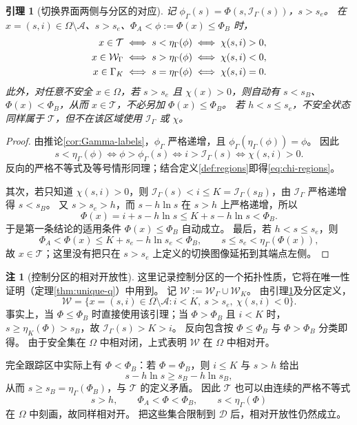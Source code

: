 \documentclass[11pt,a4paper,UTF8]{ctexart}
\newtheorem{lemma}[theorem]{引理}
\theoremstyle{definition}
\newtheorem{remark}[theorem]{注}
\newcommand{\Acal}{\mathcal A}
\newcommand{\Dcal}{\mathcal D}
\begin{document}
\begin{lemma}[切换界面两侧与分区的对应]
\label{lem:chi-regions}
记 $\phi_\Gamma(s)=\Phi(s,\mathcal I_\Gamma(s))$，$s>s_e$。
在 $x=(s,i)\in\Omega\setminus\Acal$、$s>s_e$、$\Phi_A<\phi:=\Phi(x)\le\Phi_B$ 时，
\begin{align}
x\in\mathcal T&\iff s<\eta_\Gamma(\phi)\iff\chi(s,i)>0,\notag\\
x\in\mathcal W_\Gamma&\iff s>\eta_\Gamma(\phi)\iff\chi(s,i)<0,\notag\\
x\in\Gamma_K&\iff s=\eta_\Gamma(\phi)\iff\chi(s,i)=0.
\label{eq:chi-regions}
\end{align}
此外，对任意不安全 $x\in\Omega$，若 $s>s_e$ 且 $\chi(x)>0$，则自动有
$s<s_B$、$\Phi(x)<\Phi_B$，从而 $x\in\mathcal T$，不必另加 $\Phi(x)\le\Phi_B$。
若 $h<s\le s_e$，不安全状态同样属于 $\mathcal T$，但不在该区域使用 $\mathcal I_\Gamma$ 或 $\chi$。
\end{lemma}
\begin{proof}
由推论\ref{cor:Gamma-labels}，$\phi_\Gamma$ 严格递增，且 $\phi_\Gamma(\eta_\Gamma(\phi))=\phi$。
因此
\[
s<\eta_\Gamma(\phi)
\iff \phi>\phi_\Gamma(s)
\iff i>\mathcal I_\Gamma(s)
\iff \chi(s,i)>0.
\]
反向的严格不等式及等号情形同理；结合定义\ref{def:regions}即得\eqref{eq:chi-regions}。

其次，若只知道 $\chi(s,i)>0$，则 $\mathcal I_\Gamma(s)<i\le K=\mathcal I_\Gamma(s_B)$，由 $\mathcal I_\Gamma$ 严格递增得 $s<s_B$。
又 $s>s_e>h$，而 $s-h\ln s$ 在 $s>h$ 上严格递增，所以
\[
\Phi(x)=i+s-h\ln s\le K+s-h\ln s<\Phi_B.
\]
于是第一条结论的适用条件 $\Phi(x)\le\Phi_B$ 自动成立。
最后，若 $h<s\le s_e$，则
\[
\Phi_A<\Phi(x)\le K+s_e-h\ln s_e<\Phi_B,
\qquad s\le s_e<\eta_\Gamma(\Phi(x)),
\]
故 $x\in\mathcal T$；这里没有把只在 $s>s_e$ 上定义的切换图像延拓到其端点左侧。
\end{proof}

\begin{remark}[控制分区的相对开放性]
\label{rem:relative-open-control-regions}
这里记录控制分区的一个拓扑性质，它将在唯一性证明（定理\ref{thm:unique-q}）中用到。
记 $\mathcal W:=\mathcal W_\Gamma\cup\mathcal W_K$。
由引理\ref{lem:chi-regions}及分区定义，
\[
\mathcal W
=\{x=(s,i)\in\Omega\setminus\Acal:
  i<K,\ s>s_e,\ \chi(s,i)<0\}.
\]
事实上，当 $\Phi\le\Phi_B$ 时直接使用该引理；当 $\Phi>\Phi_B$ 且 $i<K$ 时，$s\ge\eta_K(\Phi)>s_B$，故 $\mathcal I_\Gamma(s)>K>i$。
反向包含按 $\Phi\le\Phi_B$ 与 $\Phi>\Phi_B$ 分类即得。
由于安全集在 $\Omega$ 中相对闭，上式表明 $\mathcal W$ 在 $\Omega$ 中相对开。

完全跟踪区中实际上有 $\Phi<\Phi_B$：若 $\Phi=\Phi_B$，则 $i\le K$ 与 $s>h$ 给出
\[
s-h\ln s\ge s_B-h\ln s_B,
\]
从而 $s\ge s_B=\eta_\Gamma(\Phi_B)$，与 $\mathcal T$ 的定义矛盾。
因此 $\mathcal T$ 也可以由连续的严格不等式
\[
s>h,\qquad \Phi_A<\Phi<\Phi_B,\qquad
s<\eta_\Gamma(\Phi)
\]
在 $\Omega$ 中刻画，故同样相对开。
把这些集合限制到 $\Dcal$ 后，相对开放性仍然成立。
\end{remark}
\end{document}
